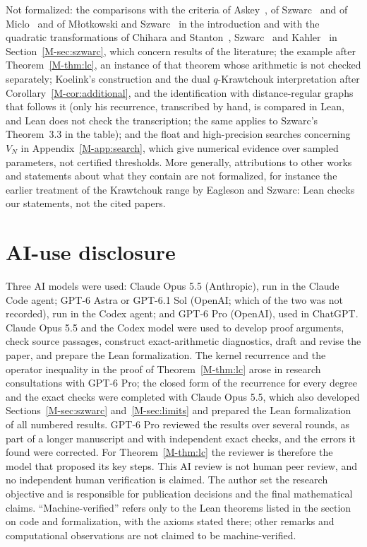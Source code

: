 Not formalized: the comparisons with the criteria of Askey~\cite{askey}, of Szwarc~\cite{szwarc2003} and of Miclo~\cite{miclo,miclo2019} and of M{\l}otkowski and Szwarc~\cite{mlotszwarc} in the introduction and with the quadratic transformations of Chihara and Stanton~\cite{chiharastanton}, Szwarc~\cite{szwarc1992,szwarc1996} and Kahler~\cite{kahler} in Section~\ref{M-sec:szwarc}, which concern results of the literature; the example after Theorem~\ref{M-thm:lc}, an instance of that theorem whose arithmetic is not checked separately; Koelink's construction and the dual $q$-Krawtchouk interpretation after Corollary~\ref{M-cor:additional}, and the identification with distance-regular graphs that follows it (only his recurrence, transcribed by hand, is compared in Lean, and Lean does not check the transcription; the same applies to Szwarc's Theorem~3.3 in the table); and the float and high-precision searches concerning $V_N$ in Appendix~\ref{M-app:search}, which give numerical evidence over sampled parameters, not certified thresholds. More generally, attributions to other works and statements about what they contain are not formalized, for instance the earlier treatment of the Krawtchouk range by Eagleson and Szwarc: Lean checks our statements, not the cited papers.

\section*{AI-use disclosure}
Three AI models were used: Claude Opus 5.5 (Anthropic), run in the Claude Code agent; GPT-6 Astra or GPT-6.1 Sol (OpenAI; which of the two was not recorded), run in the Codex agent; and GPT-6 Pro (OpenAI), used in ChatGPT. Claude Opus 5.5 and the Codex model were used to develop proof arguments, check source passages, construct exact-arithmetic diagnostics, draft and revise the paper, and prepare the Lean formalization. The kernel recurrence and the operator inequality in the proof of Theorem~\ref{M-thm:lc} arose in research consultations with GPT-6 Pro; the closed form of the recurrence for every degree and the exact checks were completed with Claude Opus 5.5, which also developed Sections~\ref{M-sec:szwarc} and~\ref{M-sec:limits} and prepared the Lean formalization of all numbered results. GPT-6 Pro reviewed the results over several rounds, as part of a longer manuscript and with independent exact checks, and the errors it found were corrected. For Theorem~\ref{M-thm:lc} the reviewer is therefore the model that proposed its key steps. This AI review is not human peer review, and no independent human verification is claimed. The author set the research objective and is responsible for publication decisions and the final mathematical claims. ``Machine-verified'' refers only to the Lean theorems listed in the section on code and formalization, with the axioms stated there; other remarks and computational observations are not claimed to be machine-verified.

